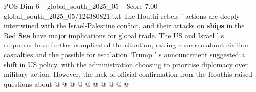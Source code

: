 \begin{textsample}{POS Dim 6 – global\_south\_2025\_05 – Score 7.00 – global\_south\_2025\_05/124380821.txt}
The Houthi rebels ' actions are deeply intertwined with the Israel-Palestine conflict, and their attacks on \textbf{ships} in the Red \textbf{Sea} have major implications for global trade.
The US and Israel ' s responses have further complicated the situation, raising concerns about civilian casualties and the possible for escalation.
Trump ' s announcement suggested a shift in US policy, with the administration choosing to prioritise diplomacy over military action.
However, the lack of official confirmation from the Houthis raised questions about @ @ @ @ @ @ @ @ @ @

\end{textsample}

